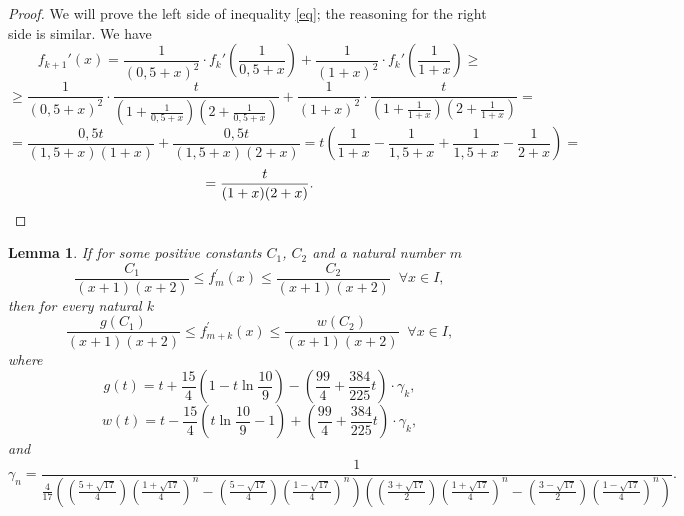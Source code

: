 \documentclass[11pt]{amsart}
\theoremstyle{plain}
\newtheorem{lemma}[theorem]{Lemma}
\theoremstyle{remark}
\begin{document}
 \begin{proof}
   We will prove the left side of inequality \eqref{eq}; the reasoning for the right side is similar. We have
   $$
   f_{k+1}'(x)=\frac{1}{(0,5+x)^2}\cdot f_k'\left(\frac{1}{0,5+x}\right)+\frac{1}{(1+x)^2}\cdot f_k'\left(\frac{1}{1+x}\right)\geq
   $$
   $$\geq\frac{1}{(0,5+x)^2}\cdot\frac{t}{\left(1+\frac{1}{0,5+x}\right)\left(2+\frac{1}{0,5+x}\right)}+
   \frac{1}{(1+x)^2}\cdot\frac{t}{\left(1+\frac{1}{1+x}\right)\left(2+\frac{1}{1+x}\right)}=
   $$
   $$
   =\frac{0,5t}{(1,5+x)(1+x)}+\frac{0,5t}{(1,5+x)(2+x)}=t\left(\frac{1}{1+x}-\frac{1}{1,5+x}+\frac{1}{1,5+x}-\frac{1}{2+x}\right)=$$
   \[= \frac{t}{(1+x)(2+x)}.\qedhere
   \]
 \end{proof}
\begin{lemma}\label{lema7}
  If for some positive constants $C_1$, $C_2$ and a natural number $m$ 
  $$\frac{C_1}{(x+1)(x+2)}\leq   f_m^{\prime} (x) \leq  \frac{C_2}{(x+1)(x+2)} \;\; \forall x \in I,    $$
 then for every natural $k$
  $$\frac{g(C_1)}{(x+1)(x+2)}\leq   f_{m+k}^{\prime}(x) \leq  \frac{w(C_2)}{(x+1)(x+2)} \;\; \forall x \in I,    $$
  where
$$g(t)=t+\frac{15}{4}\left(1-t\ln\frac{10}{9}\right)-\left(\frac{99}{4}+\frac{384}{225}t\right)\cdot\gamma_k,$$
$$
w(t)=t-\frac{15}{4}\left(t\ln\frac{10}{9}-1\right)+\left(\frac{99}{4}+\frac{384}{225}t\right)\cdot\gamma_{k},
$$
and
\begin{equation}\label{maz}
\gamma_{n}=\frac{1}{\frac{4}{17}((\frac{5+\sqrt{17}}{4})(\frac{1+\sqrt{17}}{4})^{n}-(\frac{5-\sqrt{17}}{4})(\frac{1-\sqrt{17}}{4})^{n})
 ((\frac{3+\sqrt{17}}{2})(\frac{1+\sqrt{17}}{4})^{n}-(\frac{3-\sqrt{17}}{2})(\frac{1-\sqrt{17}}{4})^{n})}.
\end{equation}
\end{lemma}
\end{document}
